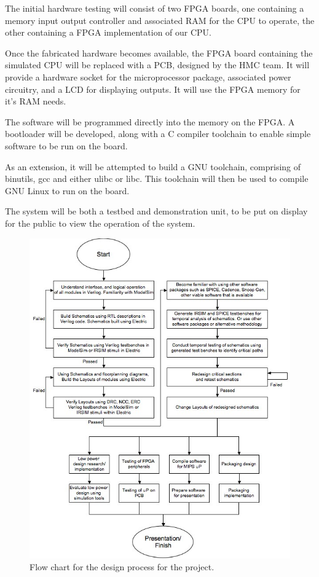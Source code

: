The initial hardware testing will consist of two FPGA boards, one containing a memory input output controller and associated RAM for the CPU to operate, the other containing a FPGA implementation of our CPU.

Once the fabricated hardware becomes available, the FPGA board containing the simulated CPU will be replaced with a PCB, designed by the HMC team. It will provide a hardware socket for the microprocessor package, associated power circuitry, and a LCD for displaying outputs. It will use the FPGA memory for it's RAM needs.

The software will be programmed directly into the memory on the FPGA. A bootloader will be developed, along with a C compiler toolchain to enable simple software to be run on the board.

As an extension, it will be attempted to build a GNU toolchain, comprising of binutils, gcc and either ulibc or libc. This toolchain will then be used to compile GNU Linux to run on the board.

The system will be both a testbed and demonstration unit, to be put on display for the public to view the operation of the system.

\begin{figure}
\centering 
\includegraphics[width=\textwidth]{designflowALL.jpg}
\caption{Flow chart for the design process for the project.}
\label{designflowALL}
\end{figure}

